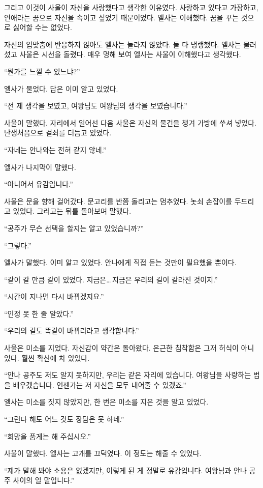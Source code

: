 그리고 이것이 사울이 자신을 사랑했다고 생각한 이유였다. 사랑하고 있다고 가장하고, 연애라는 꿈으로 자신을 속이고 싶었기 때문이었다. 엘사는 이해했다. 꿈을 꾸는 것으로 싫어할 수는 없었다.

자신의 입맞춤에 반응하지 않아도 엘사는 놀라지 않았다. 둘 다 냉랭했다. 엘사는 물러섰고 사울은 시선을 돌렸다. 매우 멍해 보여 엘사는 사울이 이해했다고 생각했다.

``뭔가를 느낄 수 있느냐?''

엘사가 물었다. 답은 이미 알고 있었다.

``전 제 생각을 보였고, 여왕님도 여왕님의 생각을 보였습니다.''

사울이 말했다. 자리에서 일어선 다음 사울은 자신의 물건을 챙겨 가방에 쑤셔 넣었다. 난생처음으로 걸쇠를 더듬고 있었다.

``자네는 안나와는 전혀 같지 않네.''

엘사가 나지막이 말했다.

``아니어서 유감입니다.''

사울은 문을 향해 걸어갔다. 문고리를 반쯤 돌리고는 멈추었다. 놋쇠 손잡이를 두드리고 있었다. 그러고는 뒤를 돌아보며 말했다.

`` 공주가 무슨 선택을 할지는 알고 있었습니까?''

``그렇다.''

엘사가 말했다. 이미 알고 있었다. 안나에게 직접 듣는 것만이 필요했을 뿐이다.

``같이 갈 만큼 같이 있었다. 지금은\ldots\,지금은 우리의 길이 갈라진 것이지.''

``시간이 지나면 다시 바뀌겠지요.''

``인정 못 한 줄 알았다.''

``우리의 길도 똑같이 바뀌리라고 생각합니다.''

사울은 미소를 지었다. 자신감이 약간은 돌아왔다. 은근한 침착함은 그저 허식이 아니었다. 훨씬 확신에 차 있었다.

``안나 공주도 저도 알지 못하지만, 우리는 같은 자리에 있습니다. 여왕님을 사랑하는 법을 배우겠습니다. 언젠가는 저 자신을 모두 내어줄 수 있겠죠.''

엘사는 미소를 짓지 않았지만, 한 번은 미소를 지은 것을 알고 있었다.

``그런다 해도 어느 것도 장담은 못 하네.''

``희망을 품게는 해 주십시오.''

사울이 말했다. 엘사는 고개를 끄덕였다. 이 정도는 해줄 수 있었다.

``제가 말해 봐야 소용은 없겠지만, 이렇게 된 게 정말로 유감입니다. 여왕님과 안나 공주 사이의 일 말입니다.''

